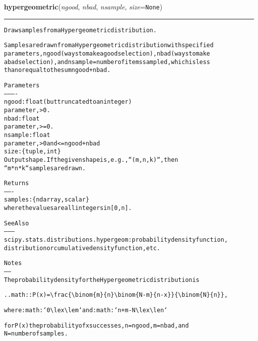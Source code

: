     \label{QSTK:qstklearn:mldiagnostics:hypergeometric}

    \vspace{0.5ex}

\hspace{.8\funcindent}\begin{boxedminipage}{\funcwidth}

    \raggedright \textbf{hypergeometric}(\textit{ngood}, \textit{nbad}, \textit{nsample}, \textit{size}={\tt None})

    \vspace{-1.5ex}

    \rule{\textwidth}{0.5\fboxrule}
\setlength{\parskip}{2ex}
\begin{alltt}
Draw samples from a Hypergeometric distribution.

Samples are drawn from a Hypergeometric distribution with specified
parameters, ngood (ways to make a good selection), nbad (ways to make
a bad selection), and nsample = number of items sampled, which is less
than or equal to the sum ngood + nbad.

Parameters
----------
ngood : float (but truncated to an integer)
        parameter, {\textgreater} 0.
nbad  : float
        parameter, {\textgreater}= 0.
nsample  : float
           parameter, {\textgreater} 0 and {\textless}= ngood+nbad
size : \{tuple, int\}
    Output shape.  If the given shape is, e.g., ``(m, n, k)``, then
    ``m * n * k`` samples are drawn.

Returns
-------
samples : \{ndarray, scalar\}
          where the values are all integers in  [0, n].

See Also
--------
scipy.stats.distributions.hypergeom : probability density function,
    distribution or cumulative density function, etc.

Notes
-----
The probability density for the Hypergeometric distribution is

.. math:: P(x) = {\textbackslash}frac\{{\textbackslash}binom\{m\}\{n\}{\textbackslash}binom\{N-m\}\{n-x\}\}\{{\textbackslash}binom\{N\}\{n\}\},

where :math:`0 {\textbackslash}le x {\textbackslash}le m` and :math:`n+m-N {\textbackslash}le x {\textbackslash}le n`

for P(x) the probability of x successes, n = ngood, m = nbad, and
N = number of samples.


\end{alltt}
\end{boxedminipage}

